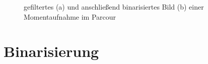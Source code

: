 \begin{figure}[hb] %
  \centering
  \qquad
  \caption{gefiltertes (a) und anschließend binarisiertes Bild (b) einer Momentaufnahme im Parcour}
\label{fig:bildvorverarbeitung_filtern}
\end{figure} 

\section{Binarisierung}


